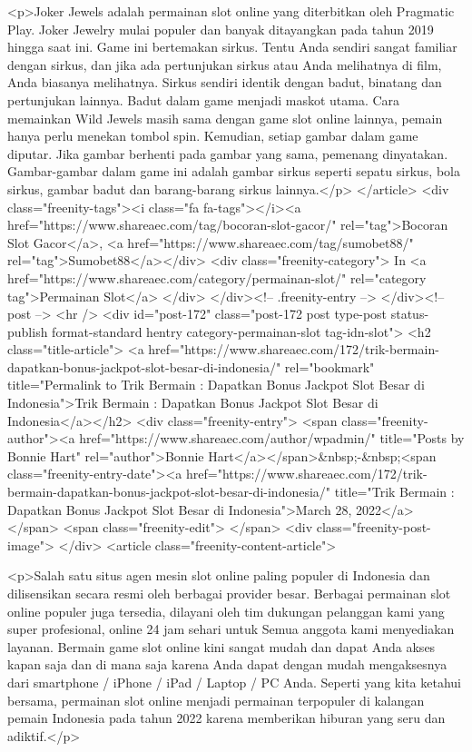 {<p>Joker Jewels adalah permainan slot online yang diterbitkan oleh Pragmatic Play. Joker Jewelry mulai populer dan banyak ditayangkan pada tahun 2019 hingga saat ini. Game ini bertemakan sirkus. Tentu Anda sendiri sangat familiar dengan sirkus, dan jika ada pertunjukan sirkus atau Anda melihatnya di film, Anda biasanya melihatnya. Sirkus sendiri identik dengan badut, binatang dan pertunjukan lainnya. Badut dalam game menjadi maskot utama. Cara memainkan Wild Jewels masih sama dengan game slot online lainnya, pemain hanya perlu menekan tombol spin. Kemudian, setiap gambar dalam game diputar. Jika gambar berhenti pada gambar yang sama, pemenang dinyatakan. Gambar-gambar dalam game ini adalah gambar sirkus seperti sepatu sirkus, bola sirkus, gambar badut dan barang-barang sirkus lainnya.</p>
									</article>
																			<div class="freenity-tags"><i class="fa fa-tags"></i><a href="https://www.shareaec.com/tag/bocoran-slot-gacor/" rel="tag">Bocoran Slot Gacor</a>, <a href="https://www.shareaec.com/tag/sumobet88/" rel="tag">Sumobet88</a></div>
																			<div class="freenity-category">
											In <a href="https://www.shareaec.com/category/permainan-slot/" rel="category tag">Permainan Slot</a>										</div>
																	</div><!-- .freenity-entry -->
							</div><!-- post -->
							<hr />
													<div id="post-172" class="post-172 post type-post status-publish format-standard hentry category-permainan-slot tag-idn-slot">
								<h2 class="title-article">
									<a href="https://www.shareaec.com/172/trik-bermain-dapatkan-bonus-jackpot-slot-besar-di-indonesia/" rel="bookmark" title="Permalink to Trik Bermain : Dapatkan Bonus Jackpot Slot Besar di Indonesia">Trik Bermain : Dapatkan Bonus Jackpot Slot Besar di Indonesia</a></h2>
								<div class="freenity-entry">
									<span class="freenity-author"><a href="https://www.shareaec.com/author/wpadmin/" title="Posts by Bonnie Hart" rel="author">Bonnie Hart</a></span>&nbsp;-&nbsp;<span class="freenity-entry-date"><a href="https://www.shareaec.com/172/trik-bermain-dapatkan-bonus-jackpot-slot-besar-di-indonesia/" title="Trik Bermain : Dapatkan Bonus Jackpot Slot Besar di Indonesia">March 28, 2022</a></span>
									<span class="freenity-edit"> </span>
									<div class="freenity-post-image">  </div>
																		<article class="freenity-content-article">
										
<p>Salah satu situs agen mesin slot online paling populer di Indonesia dan dilisensikan secara resmi oleh berbagai provider besar. Berbagai permainan slot online populer juga tersedia, dilayani oleh tim dukungan pelanggan kami yang super profesional, online 24 jam sehari untuk Semua anggota kami menyediakan layanan. Bermain game slot online kini sangat mudah dan dapat Anda akses kapan saja dan di mana saja karena Anda dapat dengan mudah mengaksesnya dari smartphone / iPhone / iPad / Laptop / PC Anda. Seperti yang kita ketahui bersama, permainan slot online menjadi permainan terpopuler di kalangan pemain Indonesia pada tahun 2022 karena memberikan hiburan yang seru dan adiktif.</p>



}
